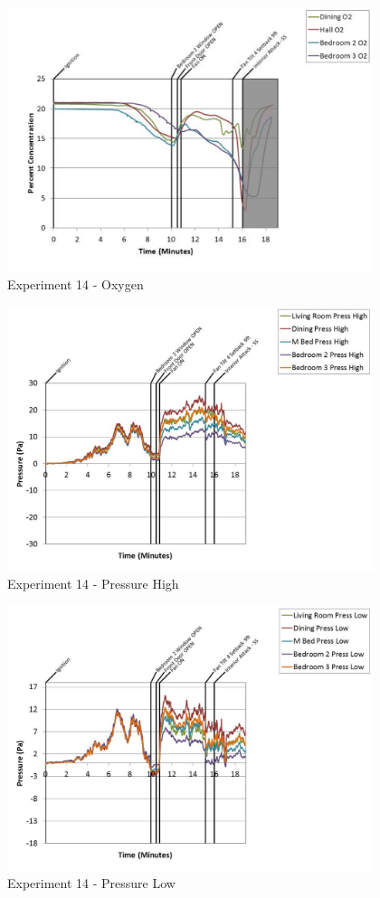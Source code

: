 \documentclass{article}
\begin{document}
\begin{appendices}
	\clearpage

	\begin{figure}[h!]
		\centering
		\includegraphics[height=3.05in]{0_Images/Results_Charts/Exp_14_Charts/Oxygen.pdf}
		\caption{Experiment 14 - Oxygen}
	\end{figure}
 

	\begin{figure}[h!]
		\centering
		\includegraphics[height=3.05in]{0_Images/Results_Charts/Exp_14_Charts/PressureHigh.pdf}
		\caption{Experiment 14 - Pressure High}
	\end{figure}
 
	\clearpage

	\begin{figure}[h!]
		\centering
		\includegraphics[height=3.05in]{0_Images/Results_Charts/Exp_14_Charts/PressureLow.pdf}
		\caption{Experiment 14 - Pressure Low}
	\end{figure}
 


\end{appendices}
\end{document}
